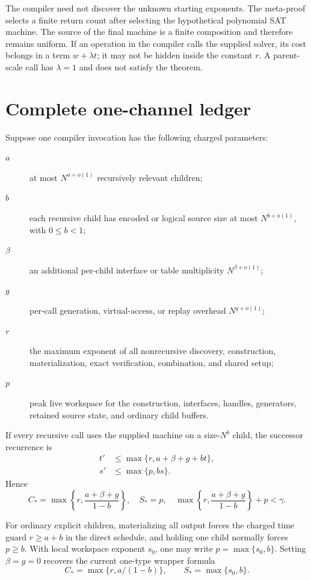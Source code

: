 \documentclass[11pt]{article}
\begin{document}
The compiler need not discover the unknown starting exponents.  The
meta-proof selects a finite return count after selecting the hypothetical
polynomial SAT machine.  The source of the final machine is a finite
composition and therefore remains uniform.  If an operation in the compiler
calls the supplied solver, its cost belongs in a term $w+\lambda t$; it may not
be hidden inside the constant $r$.  A parent-scale call has $\lambda=1$ and
does not satisfy the theorem.

\section{Complete one-channel ledger}

Suppose one compiler invocation has the following charged parameters:
\begin{description}
\item[$a$] at most $N^{a+o(1)}$ recursively relevant children;
\item[$b$] each recursive child has encoded or logical source size at most
$N^{b+o(1)}$, with $0\leq b<1$;
\item[$\beta$] an additional per-child interface or table multiplicity
$N^{\beta+o(1)}$;
\item[$g$] per-call generation, virtual-access, or replay overhead
$N^{g+o(1)}$;
\item[$r$] the maximum exponent of all nonrecursive discovery, construction,
materialization, exact verification, combination, and shared setup;
\item[$p$] peak live workspace for the construction, interfaces, handles,
generators, retained source state, and ordinary child buffers.
\end{description}
If every recursive call uses the supplied machine on a size-$N^b$ child, the
successor recurrence is
\begin{align}
 t'&\leq\max\{r,a+\beta+g+bt\},\label{eq:onechanneltime}\\
 s'&\leq\max\{p,bs\}.\label{eq:onechannelspace}
\end{align}
Hence
\begin{equation}
 \boxed{
 C_* = \max\left\{r,\frac{a+\beta+g}{1-b}\right\},\quad
 S_*=p,\quad
 \max\left\{r,\frac{a+\beta+g}{1-b}\right\}+p<\gamma.}
 \label{eq:onechannelcriterion}
\end{equation}

For ordinary explicit children, materializing all output forces the charged
time guard $r\geq a+b$ in the direct schedule, and holding one child normally
forces $p\geq b$.  With local workspace exponent $s_0$, one may write
$p=\max\{s_0,b\}$.  Setting $\beta=g=0$ recovers the current one-type wrapper
formula
\[
 C_* = \max\{r,a/(1-b)\},\qquad
 S_* = \max\{s_0,b\}.
\]
\end{document}
